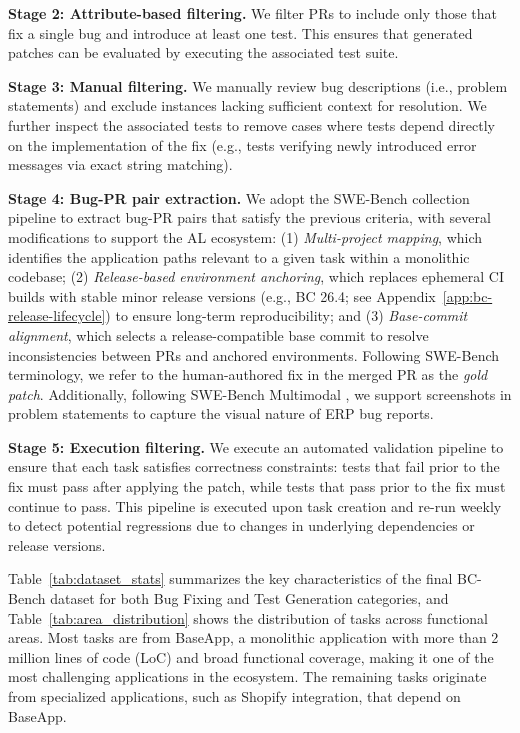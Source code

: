 \documentclass{article}
\begin{document}
\textbf{Stage 2: Attribute-based filtering.} We filter PRs to include only those that fix a single bug and introduce at least one test. This ensures that generated patches can be evaluated by executing the associated test suite.

\textbf{Stage 3: Manual filtering.} We manually review bug descriptions (i.e., problem statements) and exclude instances lacking sufficient context for resolution. We further inspect the associated tests to remove cases where tests depend directly on the implementation of the fix (e.g., tests verifying newly introduced error messages via exact string matching).

\textbf{Stage 4: Bug-PR pair extraction.} We adopt the SWE-Bench collection pipeline to extract bug-PR pairs that satisfy the previous criteria, with several modifications to support the AL ecosystem: (1) \textit{Multi-project mapping}, which identifies the application paths relevant to a given task within a monolithic codebase; (2) \textit{Release-based environment anchoring}, which replaces ephemeral CI builds with stable minor release versions (e.g., BC 26.4; see Appendix~\ref{app:bc-release-lifecycle}) to ensure long-term reproducibility; and (3) \textit{Base-commit alignment}, which selects a release-compatible base commit to resolve inconsistencies between PRs and anchored environments. Following SWE-Bench terminology, we refer to the human-authored fix in the merged PR as the \textit{gold patch}. Additionally, following SWE-Bench Multimodal \cite{yang_swe-bench_2024}, we support screenshots in problem statements to capture the visual nature of ERP bug reports.

\textbf{Stage 5: Execution filtering.} We execute an automated validation pipeline to ensure that each task satisfies correctness constraints: tests that fail prior to the fix must pass after applying the patch, while tests that pass prior to the fix must continue to pass. This pipeline is executed upon task creation and re-run weekly to detect potential regressions due to changes in underlying dependencies or release versions.

Table~\ref{tab:dataset_stats} summarizes the key characteristics of the final BC-Bench dataset for both Bug Fixing and Test Generation categories, and Table~\ref{tab:area_distribution} shows the distribution of tasks across functional areas. Most tasks are from BaseApp, a monolithic application with more than 2 million lines of code (LoC) and broad functional coverage, making it one of the most challenging applications in the ecosystem. The remaining tasks originate from specialized applications, such as Shopify integration, that depend on BaseApp.
\end{document}
